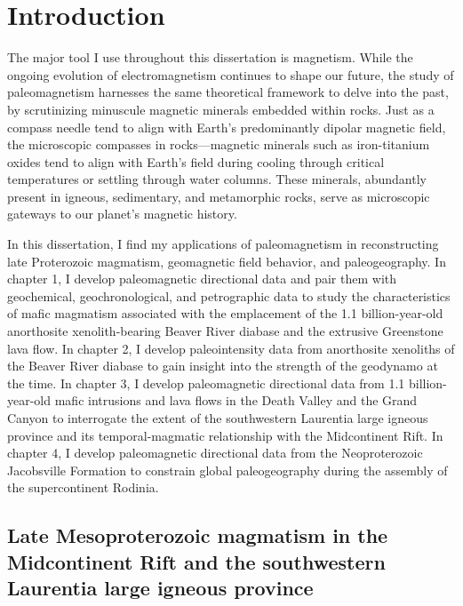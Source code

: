 \chapter[Introduction][Introduction]{Introduction}

The major tool I use throughout this dissertation is magnetism. While the ongoing evolution of electromagnetism continues to shape our future, the study of paleomagnetism harnesses the same theoretical framework to delve into the past, by scrutinizing minuscule magnetic minerals embedded within rocks. Just as a compass needle tend to align with Earth's predominantly dipolar magnetic field, the microscopic compasses in rocks---magnetic minerals such as iron-titanium oxides tend to align with Earth's field during cooling through critical temperatures or settling through water columns. These minerals, abundantly present in igneous, sedimentary, and metamorphic rocks, serve as microscopic gateways to our planet's magnetic history.

In this dissertation, I find my applications of paleomagnetism in reconstructing late Proterozoic magmatism, geomagnetic field behavior, and paleogeography. In chapter 1, I develop paleomagnetic directional data and pair them with geochemical, geochronological, and petrographic data to study the characteristics of mafic magmatism associated with the emplacement of the 1.1 billion-year-old anorthosite xenolith-bearing Beaver River diabase and the extrusive Greenstone lava flow. In chapter 2, I develop paleointensity data from anorthosite xenoliths of the Beaver River diabase to gain insight into the strength of the geodynamo at the time. In chapter 3, I develop paleomagnetic directional data from 1.1 billion-year-old mafic intrusions and lava flows in the Death Valley and the Grand Canyon to interrogate the extent of the southwestern Laurentia large igneous province and its temporal-magmatic relationship with the Midcontinent Rift. In chapter 4, I develop paleomagnetic directional data from the Neoproterozoic Jacobsville Formation to constrain global paleogeography during the assembly of the supercontinent Rodinia. 

\section{Late Mesoproterozoic magmatism in the Midcontinent Rift and the southwestern Laurentia large igneous province}

